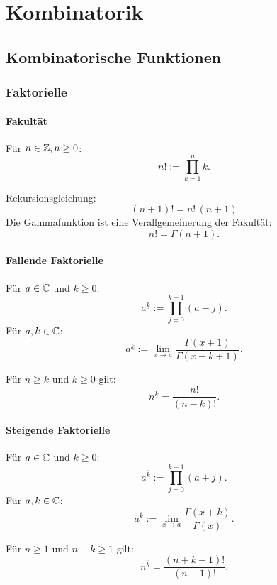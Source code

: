 
\chapter{Kombinatorik}
\section{Kombinatorische Funktionen}
\subsection{Faktorielle}
\subsubsection{Fakultät}
\begin{definition}[Fakultät]
Für $n\in\mathbb Z, n\ge 0$:
\begin{equation}
n! := \prod_{k=1}^n k.
\end{equation}
\end{definition}
\noindent
Rekursionsgleichung:
\begin{equation}
(n+1)! = n!\,(n+1)
\end{equation}
Die Gammafunktion ist eine Verallgemeinerung der Fakultät:
\begin{equation}
n! = \Gamma(n+1).
\end{equation}

\subsubsection{Fallende Faktorielle}
\begin{definition}
Für $a\in\mathbb C$ und $k\ge 0$:
\begin{equation}\label{eq:FF}
a^{\underline k} := \prod_{j=0}^{k-1} (a-j).
\end{equation}
Für $a,k\in\mathbb C$:
\begin{equation}
a^{\underline k} := \lim_{x\to a}\frac{\Gamma(x+1)}{\Gamma(x-k+1)}.
\end{equation}
\end{definition}
\noindent
Für $n\ge k$ und $k\ge 0$ gilt:
\begin{equation}
n^{\underline k} = \frac{n!}{(n-k)!}.
\end{equation}

\subsubsection{Steigende Faktorielle}
\begin{definition}
Für $a\in\mathbb C$ und $k\ge 0$:
\begin{equation}
a^{\overline k} := \prod_{j=0}^{k-1} (a+j).
\end{equation}
Für $a,k\in\mathbb C$:
\begin{equation}
a^{\overline k} := \lim_{x\to a}\frac{\Gamma(x+k)}{\Gamma(x)}.
\end{equation}
\end{definition}
\noindent
Für $n\ge 1$ und $n+k\ge 1$ gilt:
\begin{equation}
n^{\overline k} = \frac{(n+k-1)!}{(n-1)!}.
\end{equation}

